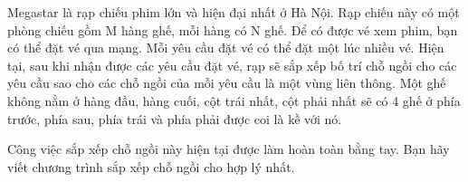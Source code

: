 Megastar là rạp chiếu phim lớn và hiện đại nhất ở Hà Nội. Rạp chiếu này có một phòng chiếu gồm M hàng ghế, mỗi hàng có N ghế. Để có được vé xem phim, bạn có thể đặt vé qua mạng. Mỗi yêu cầu đặt vé có thể đặt một lúc nhiều vé. Hiện tại, sau khi nhận được các yêu cầu đặt vé, rạp sẽ sắp xếp bố trí chỗ ngồi cho các yêu cầu sao cho các chỗ ngồi của mỗi yêu cầu là một vùng liên thông. Một ghế không nằm ở hàng đầu, hàng cuối, cột trái nhất, cột phải nhất sẽ có 4 ghế ở phía trước, phía sau, phía trái và phía phải được coi là kề với nó.  

   Công việc sắp xếp chỗ ngồi này hiện tại được làm hoàn toàn bằng tay. Bạn hãy viết chương trình sắp xếp chỗ ngồi cho hợp lý nhất.